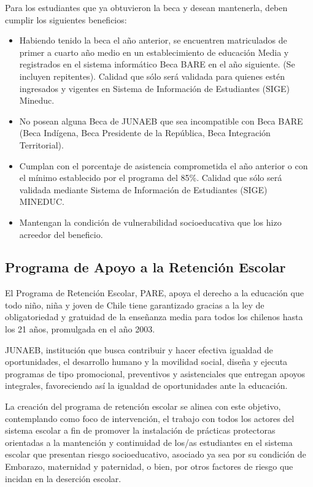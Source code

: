 Para los estudiantes que ya obtuvieron la beca y desean mantenerla, deben cumplir los siguientes beneficios: 
\begin{itemize} 
\item Habiendo tenido la beca el año anterior, se encuentren matriculados de primer a cuarto año medio en un establecimiento de educación Media y registrados en el sistema informático Beca BARE en el año siguiente. (Se incluyen repitentes). Calidad que sólo será validada para quienes estén ingresados y vigentes en Sistema de Información de Estudiantes (SIGE) Mineduc.
\item No posean alguna Beca de JUNAEB que sea incompatible con Beca BARE (Beca Indígena, Beca Presidente de la República, Beca Integración Territorial).
\item Cumplan con el porcentaje de asistencia comprometida el año anterior o con el mínimo establecido por el programa del 85\%. Calidad que sólo será validada mediante Sistema de Información de Estudiantes (SIGE) MINEDUC.
\item Mantengan la condición de vulnerabilidad socioeducativa que los hizo acreedor del beneficio. 
\end{itemize}

\subsection{Programa de Apoyo a la Retención Escolar}
El Programa de Retención Escolar, PARE, apoya el derecho a la educación que todo niño, niña y joven de Chile tiene garantizado gracias a la ley de obligatoriedad y gratuidad de la enseñanza media para todos los chilenos hasta los 21 años, promulgada en el año 2003.

JUNAEB, institución que busca contribuir y hacer efectiva igualdad de oportunidades, el desarrollo humano y la movilidad social, diseña y ejecuta programas de tipo promocional, preventivos y asistenciales que entregan apoyos integrales, favoreciendo así la igualdad de oportunidades ante la educación.

La creación del programa de retención escolar se alinea con este objetivo, contemplando como foco de intervención, el trabajo con todos los actores del sistema escolar a fin de promover la instalación de prácticas protectoras orientadas a la mantención y continuidad de los/as estudiantes en el sistema escolar que presentan riesgo socioeducativo, asociado ya sea por su condición de Embarazo, maternidad y paternidad, o bien, por otros factores de riesgo que incidan en la deserción escolar.

